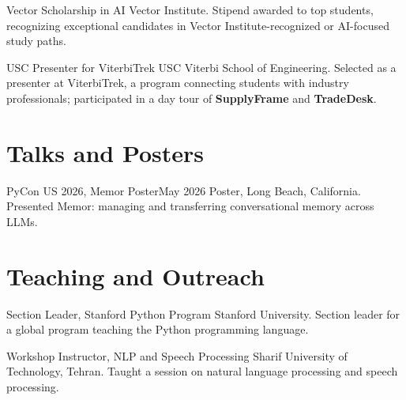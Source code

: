   \cventry
    {Vector Scholarship in AI}{}
    {Vector Institute. Stipend awarded to top students, recognizing exceptional candidates in Vector Institute-recognized or AI-focused study paths.}

  \cventry
    {USC Presenter for ViterbiTrek}{}
    {USC Viterbi School of Engineering. Selected as a presenter at ViterbiTrek, a program connecting students with industry professionals; participated in a day tour of \textbf{SupplyFrame} and \textbf{TradeDesk}.}

\resumeSubHeadingListEnd

\section{Talks and Posters}
\resumeSubHeadingListStart

  \cventry
    {PyCon US 2026, Memor Poster}{May 2026}
    {Poster, Long Beach, California. Presented Memor: managing and transferring conversational memory across LLMs.}

\resumeSubHeadingListEnd

\section{Teaching and Outreach}
\resumeSubHeadingListStart

  \cventry
    {Section Leader, Stanford Python Program}{}
    {Stanford University. Section leader for a global program teaching the Python programming language.}

  \cventry
    {Workshop Instructor, NLP and Speech Processing}{}
    {Sharif University of Technology, Tehran. Taught a session on natural language processing and speech processing.}

\resumeSubHeadingListEnd

